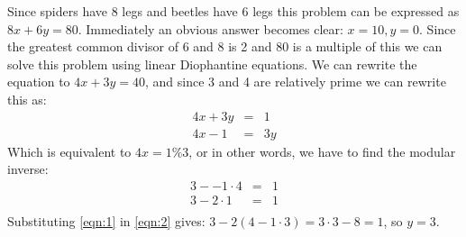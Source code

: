 Since spiders have 8 legs and beetles have 6 legs this problem can be expressed as $8x + 6y = 80$. Immediately an obvious answer becomes clear: $x=10, y=0$. Since the greatest common divisor of 6 and 8 is 2 and 80 is a multiple of this we can solve this problem using linear Diophantine equations. We can rewrite the equation to $4x + 3y = 40$, and since 3 and 4 are relatively prime we can rewrite this as:
\begin{eqnarray}
	4x + 3y &=& 1 \\
	4x - 1 &=& 3y
\end{eqnarray}
Which is equivalent to $4x = 1 \% 3$, or in other words, we have to find the modular inverse:
\begin{eqnarray}
	3 - -1 \cdot 4 &=& 1 \label{eqn:1} \\
	3 - 2 \cdot 1 &=& 1 \label{eqn:2} \\
\end{eqnarray}
Substituting \autoref{eqn:1} in \autoref{eqn:2} gives: $3 - 2 (4 - 1 \cdot 3) = 3 \cdot 3 - 8 = 1$, so $y = 3$.